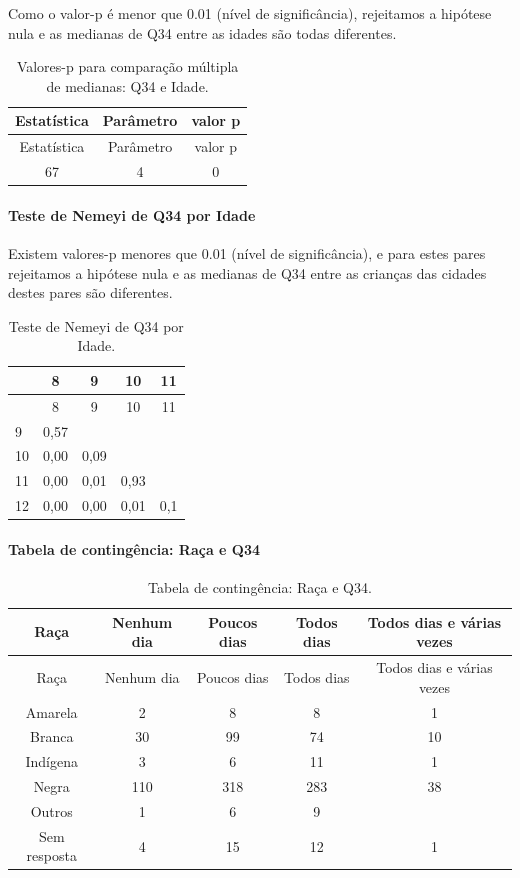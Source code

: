 \documentclass[]{article}
\let\oldparagraph\paragraph
\renewcommand{\paragraph}[1]{\oldparagraph{#1}\mbox{}}
\begin{document}
Como o valor-p é menor que 0.01 (nível de significância), rejeitamos a hipótese nula e as medianas de Q34 entre as idades são todas diferentes.

\begin{longtable}[]{@{}ccc@{}}
\caption{\label{tab:unnamed-chunk-1219}Valores-p para comparação múltipla de medianas: Q34 e Idade.}\tabularnewline
\toprule
Estatística & Parâmetro & valor p\tabularnewline
\midrule
\endfirsthead
\toprule
Estatística & Parâmetro & valor p\tabularnewline
\midrule
\endhead
67 & 4 & 0\tabularnewline
\bottomrule
\end{longtable}

\hypertarget{teste-de-nemeyi-de-q34-por-idade}{%
\paragraph{Teste de Nemeyi de Q34 por Idade}\label{teste-de-nemeyi-de-q34-por-idade}}

Existem valores-p menores que 0.01 (nível de significância), e para estes pares rejeitamos a hipótese nula e as medianas de Q34 entre as crianças das cidades destes pares são diferentes.

\begin{longtable}[]{@{}lcccc@{}}
\caption{\label{tab:unnamed-chunk-1221}Teste de Nemeyi de Q34 por Idade.}\tabularnewline
\toprule
& 8 & 9 & 10 & 11\tabularnewline
\midrule
\endfirsthead
\toprule
& 8 & 9 & 10 & 11\tabularnewline
\midrule
\endhead
9 & 0,57 & & &\tabularnewline
10 & 0,00 & 0,09 & &\tabularnewline
11 & 0,00 & 0,01 & 0,93 &\tabularnewline
12 & 0,00 & 0,00 & 0,01 & 0,1\tabularnewline
\bottomrule
\end{longtable}

\cleardoublepage

\hypertarget{tabela-de-continguxeancia-rauxe7a-e-q34}{%
\paragraph{Tabela de contingência: Raça e Q34}\label{tabela-de-continguxeancia-rauxe7a-e-q34}}

\begin{longtable}[]{@{}ccccc@{}}
\caption{\label{tab:unnamed-chunk-1222}Tabela de contingência: Raça e Q34.}\tabularnewline
\toprule
Raça & Nenhum dia & Poucos dias & Todos dias & Todos dias e várias vezes\tabularnewline
\midrule
\endfirsthead
\toprule
Raça & Nenhum dia & Poucos dias & Todos dias & Todos dias e várias vezes\tabularnewline
\midrule
\endhead
Amarela & 2 & 8 & 8 & 1\tabularnewline
Branca & 30 & 99 & 74 & 10\tabularnewline
Indígena & 3 & 6 & 11 & 1\tabularnewline
Negra & 110 & 318 & 283 & 38\tabularnewline
Outros & 1 & 6 & 9 &\tabularnewline
Sem resposta & 4 & 15 & 12 & 1\tabularnewline
\bottomrule
\end{longtable}
\end{document}
